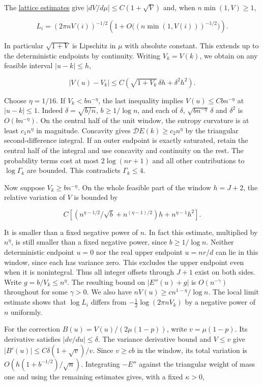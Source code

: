 \documentclass[11pt]{article}
\begin{document}
The \hyperref[app:small-var]{lattice estimates} give $|dV/d\mu|\le C(1+\sqrt V)$ and, when $n\min(1,V)\ge1$,

\[
L_i=(2\pi nV(i))^{-1/2}
\left(1+O\bigl((n\min(1,V(i)))^{-1/2}\bigr)\right).
\]

In particular $\sqrt{1+V}$ is Lipschitz in $\mu$ with absolute constant. This extends up to the deterministic endpoints by continuity. Writing $V_k=V(k)$, we obtain on any feasible interval $|u-k|\le h$,

\[
|V(u)-V_k|\le C\left(\sqrt{1+V_k}\,\delta h+\delta^2h^2\right).
\]

Choose $\eta=1/16$. If $V_k<b n^{-\eta}$, the last inequality implies $V(u)\le Cb n^{-\eta}$ at $|u-k|\le1$. Indeed $\delta=\sqrt{b/n}$, $b\ge1/\log n$, and each of $\delta$, $\sqrt{b n^{-\eta}}\,\delta$ and $\delta^2$ is $O(b n^{-\eta})$. On the central half of the unit window, the entropy curvature is at least $c_1n^\eta$ in magnitude. Concavity gives $\mathcal D E(k)\ge c_2 n^\eta$ by the triangular second-difference integral. If an outer endpoint is exactly saturated, retain the central half of the integral and use concavity and continuity on the rest. The probability terms cost at most $2\log(nr+1)$ and all other contributions to $\log\Gamma_k$ are bounded. This contradicts $\Gamma_k\le4$.

Now suppose $V_k\ge b n^{-\eta}$. On the whole feasible part of the window $h=J+2$, the relative variation of $V$ is bounded by

\[
C\left[\left(n^{\eta-1/2}/\sqrt b+n^{(\eta-1)/2}\right)h
+n^{\eta-1}h^2\right].
\]

It is smaller than a fixed negative power of $n$. In fact this estimate, multiplied by $n^\eta$, is still smaller than a fixed negative power, since $b\ge1/\log n$. Neither deterministic endpoint $u=0$ nor the real upper endpoint $u=nr/d$ can lie in this window, since each has variance zero. This excludes the upper endpoint even when it is nonintegral. Thus all integer offsets through $J+1$ exist on both sides. Write $g=b/V_k\le n^\eta$. The resulting bound on $|E''(u)+g|$ is $O(n^{-\gamma})$ throughout for some $\gamma>0$. We also have $nV(u)\ge c n^{1-\eta}/\log n$. The local limit estimate shows that $\log L_i$ differs from $-\tfrac12\log(2\pi n V_k)$ by a negative power of $n$ uniformly.

For the correction $B(u)=V(u)/(2\mu(1-p))$, write $v=\mu(1-p)$. Its derivative satisfies $|dv/du|\le\delta$. The variance derivative bound and $V\le v$ give $|B'(u)|\le C\delta(1+\sqrt v)/v$. Since $v\ge c b$ in the window, its total variation is $O(h(1+b^{-1/2})/\sqrt n)$. Integrating $-E''$ against the triangular weight of mass one and using the remaining estimates gives, with a fixed $\kappa>0$,
\end{document}
